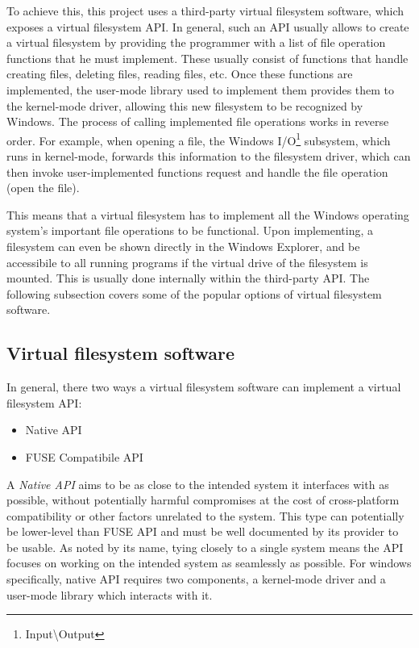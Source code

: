 To achieve this, this project uses a third-party virtual filesystem software, which exposes a virtual filesystem API. In general, such an API usually allows to create a virtual filesystem by providing the programmer with a list of file operation functions that he must implement. These usually consist of functions that handle creating files, deleting files, reading files, etc. Once these functions are implemented, the user-mode library used to implement them provides them to the kernel-mode driver, allowing this new filesystem to be recognized by Windows. The process of calling implemented file operations works in reverse order. For example, when opening a file, the Windows I/O\footnote{Input\textbackslash{}Output} subsystem, which runs in kernel-mode, forwards this information to the filesystem driver, which can then invoke user-implemented functions request and handle the file operation (open the file).\cite{GitDokany}

This means that a virtual filesystem has to implement all the Windows operating system's important file operations to be functional. Upon implementing, a filesystem can even be shown directly in the Windows Explorer, and be accessibile to all running programs if the virtual drive of the filesystem is mounted. This is usually done internally within the third-party API. The following subsection covers some of the popular options of virtual filesystem software.

\subsection*{Virtual filesystem software}
\label{vfsapitypes}
In general, there two ways a virtual filesystem software can implement a virtual filesystem API:

\begin{itemize}
    \item Native API
    \item FUSE Compatibile API
\end{itemize}

A \textit{Native API} aims to be as close to the intended system it interfaces with as possible, without potentially harmful compromises at the cost of cross-platform compatibility or other factors unrelated to the system. This type can potentially be lower-level than FUSE API and must be well documented by its provider to be usable. As noted by its name, tying closely to a single system means the API focuses on working on the intended system as seamlessly as possible. For windows specifically, native API requires two components, a kernel-mode driver and a user-mode library which interacts with it.

